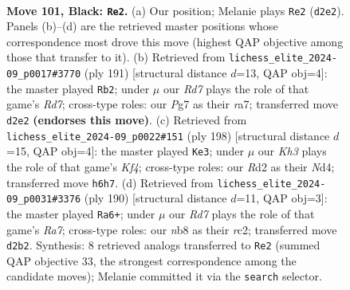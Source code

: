 \documentclass[11pt]{article}
\begin{document}
\clearpage

\begin{figure}[p]\centering
\begin{subfigure}{0.46\textwidth}\centering
\resizebox{\linewidth}{!}{%
\newchessgame
\chessboard[
  setfen={1NR5/6p1/5p1k/7p/7P/6PK/3r4/8 b - - 27 101},
  showmover=false,
  pgfstyle=straightmove, color=movearrow, markmove={d2-e2}
]}
\caption{}
\end{subfigure}\hfill
\begin{subfigure}{0.46\textwidth}\centering
\resizebox{\linewidth}{!}{%
\newchessgame
\chessboard[
  setfen={8/R7/6pk/7p/7P/6PK/3r4/8 b - - 29 96},
  showmover=false,
  pgfstyle=straightmove, color=movearrow, markmove={d2-b2}
]}
\caption{}
\end{subfigure}
\\[4pt]
\begin{subfigure}{0.46\textwidth}\centering
\resizebox{\linewidth}{!}{%
\newchessgame
\chessboard[
  setfen={8/5k2/6p1/4P2p/3N1K1P/2n3P1/8/8 w - - 7 100},
  showmover=false,
  pgfstyle=straightmove, color=movearrow, markmove={f4-e3}
]}
\caption{}
\end{subfigure}\hfill
\begin{subfigure}{0.46\textwidth}\centering
\resizebox{\linewidth}{!}{%
\newchessgame
\chessboard[
  setfen={8/R7/5k2/4p1p1/4P1P1/5PK1/2r5/8 w - - 87 96},
  showmover=false,
  pgfstyle=straightmove, color=movearrow, markmove={a7-a6}
]}
\caption{}
\end{subfigure}
\caption{\textbf{Move 101, Black: \texttt{Re2}.} (a) Our position; Melanie plays \texttt{Re2} (\texttt{d2e2}). Panels (b)--(d) are the retrieved master positions whose correspondence most drove this move (highest QAP objective among those that transfer to it). (b) Retrieved from \texttt{lichess\_elite\_2024-09\_p0017\#3770} (ply 191) [structural distance $d$=13, QAP obj=4]: the master played \texttt{Rb2}; under $\mu$ our \emph{Rd7} plays the role of that game's \emph{Rd7}; cross-type roles: our \emph{P}g7 as their \emph{r}a7; transferred move \texttt{d2e2} \textbf{(endorses this move)}. (c) Retrieved from \texttt{lichess\_elite\_2024-09\_p0022\#151} (ply 198) [structural distance $d$=15, QAP obj=4]: the master played \texttt{Ke3}; under $\mu$ our \emph{Kh3} plays the role of that game's \emph{Kf4}; cross-type roles: our \emph{R}d2 as their \emph{N}d4; transferred move \texttt{h6h7}. (d) Retrieved from \texttt{lichess\_elite\_2024-09\_p0031\#3376} (ply 190) [structural distance $d$=11, QAP obj=3]: the master played \texttt{Ra6+}; under $\mu$ our \emph{Rd7} plays the role of that game's \emph{Ra7}; cross-type roles: our \emph{n}b8 as their \emph{r}c2; transferred move \texttt{d2b2}. Synthesis: 8 retrieved analogs transferred to \texttt{Re2} (summed QAP objective 33, the strongest correspondence among the candidate moves); Melanie committed it via the \texttt{search} selector.}
\label{fig:thought-m201}
\end{figure}
\end{document}
